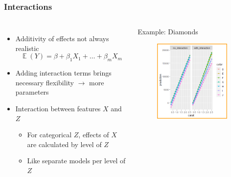 \documentclass[
    utf8,
    aspectratio=169
]{beamer}  %
\DeclareMathOperator{\E}{\mathbb{E}}  %
\begin{document}
\begin{frame}
\frametitle{Interactions}
\begin{columns}
	\begin{itemize}
		\item Additivity of effects not always realistic
		$$
			\E(Y) = \beta + \beta_1 X_1 + \dots + \beta_m X_m
		$$
		\item Adding interaction terms brings necessary flexibility $\rightarrow$ more parameters
		\item Interaction between features $X$ and $Z$
		\begin{itemize}
			\item For categorical $Z$, effects of $X$ are calculated by level of $Z$
			\item Like separate models per level of $Z$
		\end{itemize}
	\end{itemize}
	
	\begin{block}{Example: Diamonds}
		\begin{figure}
			\includegraphics[width=0.95\textwidth]{pics/interactions.png}
		\end{figure}
	\end{block}
\end{columns}
\end{frame}
\end{document}
